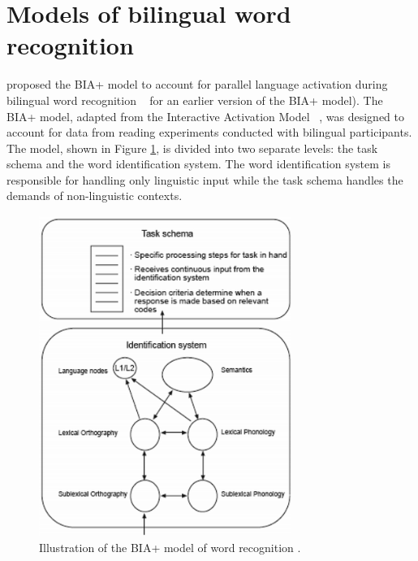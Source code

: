 \section{Models of bilingual word recognition}
\label{modelsofbilingualwordrecognition}

 \citet{Dijkstra2002} proposed the BIA+ model to account for parallel language activation during bilingual word recognition ~\citep[see also][]{Dijkstra1998a} for an earlier version of the BIA+ model). The BIA+ model, adapted from the Interactive Activation Model ~\citep[see][]{McClelland1981}, was designed to account for data from reading experiments conducted with bilingual participants. The model, shown in Figure \ref{fig:biaplus}, is divided into two separate levels: the task schema and the word identification system. The word identification system is responsible for handling only linguistic input while the task schema handles the demands of non-linguistic contexts. 

\begin{figure}[htbp]
\centering
\includegraphics[width=233pt,height=296pt]{biaplus.png}
\caption{Illustration of the BIA+ model of word recognition \citep{Dijkstra2002}.}
\label{fig:biaplus}
\end{figure}

